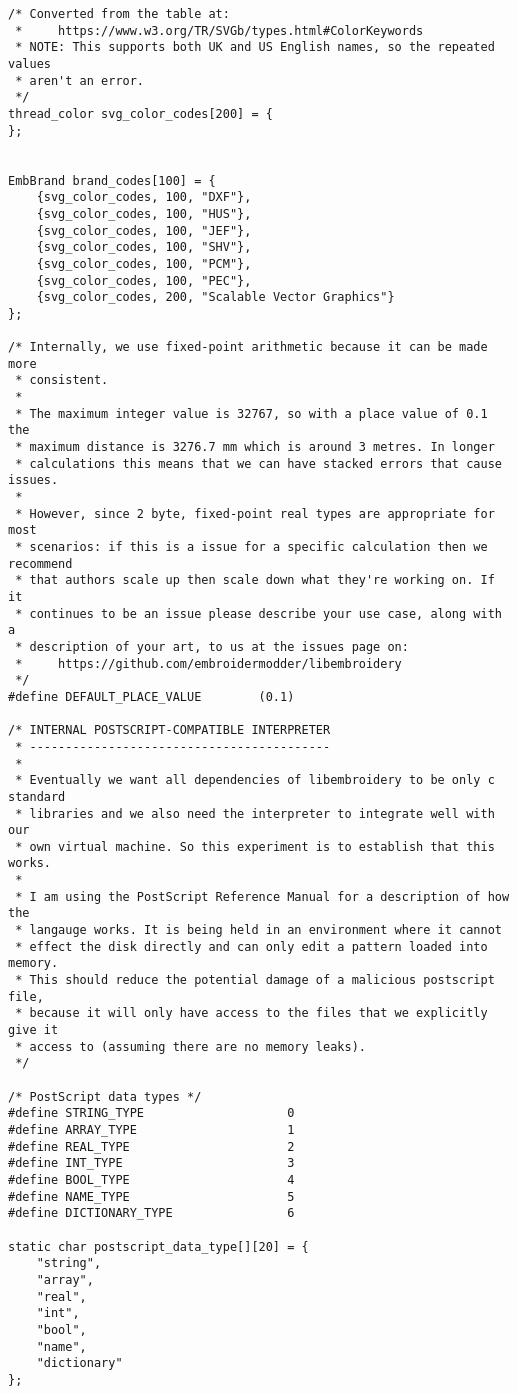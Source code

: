 \begin{lstlisting}
/* Converted from the table at:
 *     https://www.w3.org/TR/SVGb/types.html#ColorKeywords
 * NOTE: This supports both UK and US English names, so the repeated values
 * aren't an error.
 */
thread_color svg_color_codes[200] = {
};


EmbBrand brand_codes[100] = {
    {svg_color_codes, 100, "DXF"},
    {svg_color_codes, 100, "HUS"},
    {svg_color_codes, 100, "JEF"},
    {svg_color_codes, 100, "SHV"},
    {svg_color_codes, 100, "PCM"},
    {svg_color_codes, 100, "PEC"},
    {svg_color_codes, 200, "Scalable Vector Graphics"}
};

/* Internally, we use fixed-point arithmetic because it can be made more
 * consistent.
 *
 * The maximum integer value is 32767, so with a place value of 0.1 the
 * maximum distance is 3276.7 mm which is around 3 metres. In longer
 * calculations this means that we can have stacked errors that cause issues.
 *
 * However, since 2 byte, fixed-point real types are appropriate for most
 * scenarios: if this is a issue for a specific calculation then we recommend
 * that authors scale up then scale down what they're working on. If it
 * continues to be an issue please describe your use case, along with a
 * description of your art, to us at the issues page on:
 *     https://github.com/embroidermodder/libembroidery
 */
#define DEFAULT_PLACE_VALUE        (0.1)

/* INTERNAL POSTSCRIPT-COMPATIBLE INTERPRETER
 * ------------------------------------------
 *
 * Eventually we want all dependencies of libembroidery to be only c standard
 * libraries and we also need the interpreter to integrate well with our
 * own virtual machine. So this experiment is to establish that this works.
 *
 * I am using the PostScript Reference Manual for a description of how the
 * langauge works. It is being held in an environment where it cannot
 * effect the disk directly and can only edit a pattern loaded into memory.
 * This should reduce the potential damage of a malicious postscript file,
 * because it will only have access to the files that we explicitly give it
 * access to (assuming there are no memory leaks).
 */

/* PostScript data types */
#define STRING_TYPE                    0
#define ARRAY_TYPE                     1
#define REAL_TYPE                      2
#define INT_TYPE                       3
#define BOOL_TYPE                      4
#define NAME_TYPE                      5
#define DICTIONARY_TYPE                6

static char postscript_data_type[][20] = {
    "string",
    "array",
    "real",
    "int",
    "bool",
    "name",
    "dictionary"
};


\end{lstlisting}
